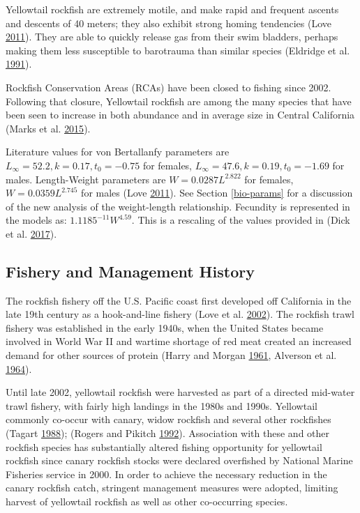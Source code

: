 \documentclass[12pt,]{article}
\begin{document}
Yellowtail rockfish are extremely motile, and make rapid and frequent
ascents and descents of 40 meters; they also exhibit strong homing
tendencies (Love \protect\hyperlink{ref-Love2011}{2011}). They are able
to quickly release gas from their swim bladders, perhaps making them
less susceptible to barotrauma than similar species (Eldridge et al.
\protect\hyperlink{ref-Eldridge1991}{1991}).

Rockfish Conservation Areas (RCAs) have been closed to fishing since
2002. Following that closure, Yellowtail rockfish are among the many
species that have been seen to increase in both abundance and in average
size in Central California (Marks et al.
\protect\hyperlink{ref-Marks2015}{2015}).

Literature values for von Bertallanfy parameters are
\(L_\infty = 52.2, k = 0.17, t_0 = -0.75\) for females,
\(L_\infty = 47.6, k=0.19, t_0 = -1.69\) for males. Length-Weight
parameters are \(W = 0.0287L^{2.822}\) for females,
\(W = 0.0359L^{2.745}\) for males (Love
\protect\hyperlink{ref-Love2011}{2011}). See Section \ref{bio-params}
for a discussion of the new analysis of the weight-length relationship.
Fecundity is represented in the models as: \(1.1185^{-11}W^{4.59}\).
This is a rescaling of the values provided in (Dick et al.
\protect\hyperlink{ref-Dick2017}{2017}).

\subsection{Fishery and Management
History}\label{fishery-and-management-history}

The rockfish fishery off the U.S. Pacific coast first developed off
California in the late 19th century as a hook-and-line fishery (Love et
al. \protect\hyperlink{ref-Love2002}{2002}). The rockfish trawl fishery
was established in the early 1940s, when the United States became
involved in World War II and wartime shortage of red meat created an
increased demand for other sources of protein (Harry and Morgan
\protect\hyperlink{ref-Harry1961}{1961}, Alverson et al.
\protect\hyperlink{ref-Alverson1964}{1964}).

Until late 2002, yellowtail rockfish were harvested as part of a
directed mid-water trawl fishery, with fairly high landings in the 1980s
and 1990s. Yellowtail commonly co-occur with canary, widow rockfish and
several other rockfishes (Tagart
\protect\hyperlink{ref-Tagart1988}{1988}); (Rogers and Pikitch
\protect\hyperlink{ref-Rogers1992}{1992}). Association with these and
other rockfish species has substantially altered fishing opportunity for
yellowtail rockfish since canary rockfish stocks were declared
overfished by National Marine Fisheries service in 2000. In order to
achieve the necessary reduction in the canary rockfish catch, stringent
management measures were adopted, limiting harvest of yellowtail
rockfish as well as other co-occurring species.
\end{document}
